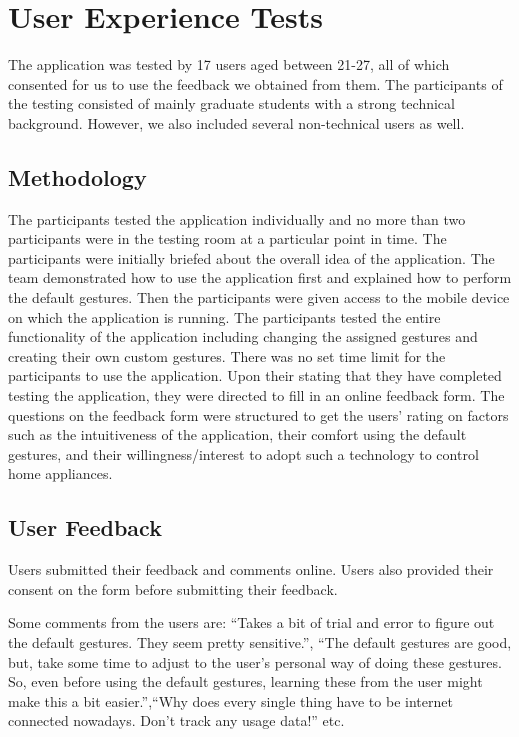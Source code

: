 \documentclass[journal]{IEEEtran}
\begin{document}
 

\section{User Experience Tests}

The application was tested by 17 users aged between 21-27, all of which consented for us to use the feedback we obtained from them. The participants of the testing consisted of mainly graduate students with a strong technical background. However, we also included several non-technical users as well.

\subsection{Methodology}

The participants tested the application individually and no more than two participants were in the testing room at a particular point in time. The participants were initially briefed about the overall idea of the application. The team demonstrated how to use the application first and explained how to perform the default gestures. Then the participants were given access to the mobile device on which the application is running. The participants tested the entire functionality of the application including changing the assigned gestures and creating their own custom gestures. There was no set time limit for the participants to use the application. Upon their stating that they have completed testing the application, they were directed to fill in an online feedback form. The questions on the feedback form were structured to get the users' rating on factors such as the intuitiveness of the application, their comfort using the default gestures, and their willingness/interest to adopt such a technology to control home appliances.
\subsection{User Feedback}

Users submitted their feedback and comments online. Users also provided their consent on the form before submitting their feedback.

Some comments from the users are: ``Takes a bit of trial and error to figure out the default gestures. They seem pretty sensitive.'', ``The default gestures are good, but, take some time to adjust to the user's personal way of doing these gestures. So, even before using the default gestures, learning  these from the user might make this a bit easier.'',``Why does every single thing have to be internet connected nowadays. Don't track any usage data!'' etc. 
\end{document}
